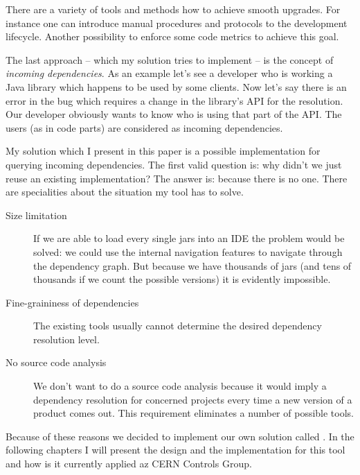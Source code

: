 There are a variety of tools and methods how to achieve smooth upgrades. For
instance one can introduce manual procedures and protocols to the development
lifecycle. Another possibility to enforce some code metrics to achieve this
goal.

The last approach -- which my solution tries to implement -- is the concept of
\emph{incoming dependencies}. As an example let's see a developer who is working
a Java library which happens to be used by some clients. Now let's say there is
an error in the bug which requires a change in the library's API for the
resolution. Our developer obviously wants to know who is using that part of the
API. The users (as in code parts) are considered as incoming dependencies.
 
My solution which I present in this paper is a possible implementation for
querying incoming dependencies. The first valid question is: why didn't we just
reuse an existing implementation? The answer is: because there is no one.
There are specialities about the situation my tool has to solve.
\begin{description}
\item[Size limitation] If we are able to load every single jars into an IDE the
problem would be solved: we could use the internal navigation features to navigate 
through the dependency graph. But because we have thousands of jars (and tens of 
thousands if we count the possible versions) it is evidently impossible.   
\item[Fine-graininess of dependencies] The existing tools usually cannot determine
 the desired dependency resolution level. 
\item[No source code analysis] We don't want to do a source code analysis because 
it would imply a dependency resolution for concerned projects every time a new version 
of a product comes out. This requirement eliminates a number of possible tools. 
\end{description}

Because of these reasons we decided to implement our own solution called \ptool{}.
In the following chapters I will present the design and the implementation for
this tool and how is it currently applied az CERN Controls Group.

